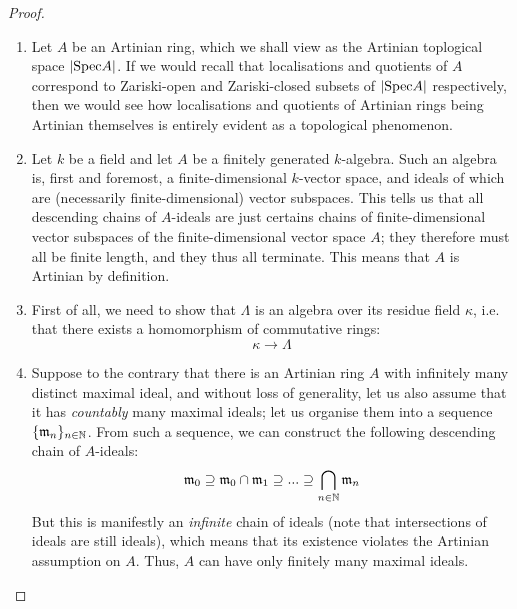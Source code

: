                 \begin{proof}
                    \noindent
                    \begin{enumerate}
                        \item Let $A$ be an Artinian ring, which we shall view as the Artinian toplogical space $|\mathrm{Spec} A|$. If we would recall that localisations and quotients of $A$ correspond to Zariski-open and Zariski-closed subsets of $|\mathrm{Spec} A|$ respectively, then we would see how localisations and quotients of Artinian rings being Artinian themselves is entirely evident as a topological phenomenon. 
                        \item Let $k$ be a field and let $A$ be a finitely generated $k$-algebra. Such an algebra is, first and foremost, a finite-dimensional $k$-vector space, and ideals of which are (necessarily finite-dimensional) vector subspaces. This tells us that all descending chains of $A$-ideals are just certains chains of finite-dimensional vector subspaces of the finite-dimensional vector space $A$; they therefore must all be finite length, and they thus all terminate. This means that $A$ is Artinian by definition.
                        \item First of all, we need to show that $\Lambda$ is an algebra over its residue field $\kappa$, i.e. that there exists a homomorphism of commutative rings:
                            $$\kappa \to \Lambda$$
                        
                        \item Suppose to the contrary that there is an Artinian ring $A$ with infinitely many distinct maximal ideal, and without loss of generality, let us also assume that it has \textit{countably} many maximal ideals; let us organise them into a sequence $\{\mathfrak{m}_n\}_{n \in \mathbb{N}}$. From such a sequence, we can construct the following descending chain of $A$-ideals:
                            $$\mathfrak{m}_0 \supseteq \mathfrak{m}_0 \cap \mathfrak{m}_1 \supseteq ... \supseteq \bigcap_{n \in \mathbb{N}} \mathfrak{m}_n$$
                        But this is manifestly an \textit{infinite} chain of ideals (note that intersections of ideals are still ideals), which means that its existence violates the Artinian assumption on $A$. Thus, $A$ can have only finitely many maximal ideals.
                        

\end{enumerate}
\end{proof}
